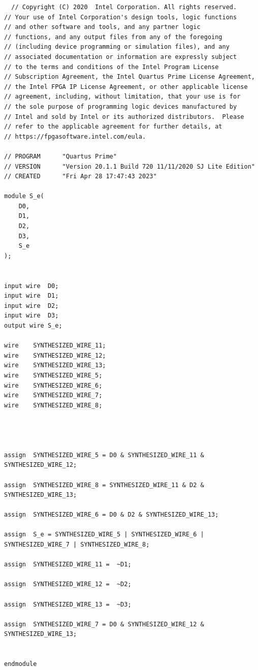 \documentclass{article}
\begin{document}
\begin{lstlisting}
  // Copyright (C) 2020  Intel Corporation. All rights reserved.
// Your use of Intel Corporation's design tools, logic functions 
// and other software and tools, and any partner logic 
// functions, and any output files from any of the foregoing 
// (including device programming or simulation files), and any 
// associated documentation or information are expressly subject 
// to the terms and conditions of the Intel Program License 
// Subscription Agreement, the Intel Quartus Prime License Agreement,
// the Intel FPGA IP License Agreement, or other applicable license
// agreement, including, without limitation, that your use is for
// the sole purpose of programming logic devices manufactured by
// Intel and sold by Intel or its authorized distributors.  Please
// refer to the applicable agreement for further details, at
// https://fpgasoftware.intel.com/eula.

// PROGRAM		"Quartus Prime"
// VERSION		"Version 20.1.1 Build 720 11/11/2020 SJ Lite Edition"
// CREATED		"Fri Apr 28 17:47:43 2023"

module S_e(
	D0,
	D1,
	D2,
	D3,
	S_e
);


input wire	D0;
input wire	D1;
input wire	D2;
input wire	D3;
output wire	S_e;

wire	SYNTHESIZED_WIRE_11;
wire	SYNTHESIZED_WIRE_12;
wire	SYNTHESIZED_WIRE_13;
wire	SYNTHESIZED_WIRE_5;
wire	SYNTHESIZED_WIRE_6;
wire	SYNTHESIZED_WIRE_7;
wire	SYNTHESIZED_WIRE_8;




assign	SYNTHESIZED_WIRE_5 = D0 & SYNTHESIZED_WIRE_11 & SYNTHESIZED_WIRE_12;

assign	SYNTHESIZED_WIRE_8 = SYNTHESIZED_WIRE_11 & D2 & SYNTHESIZED_WIRE_13;

assign	SYNTHESIZED_WIRE_6 = D0 & D2 & SYNTHESIZED_WIRE_13;

assign	S_e = SYNTHESIZED_WIRE_5 | SYNTHESIZED_WIRE_6 | SYNTHESIZED_WIRE_7 | SYNTHESIZED_WIRE_8;

assign	SYNTHESIZED_WIRE_11 =  ~D1;

assign	SYNTHESIZED_WIRE_12 =  ~D2;

assign	SYNTHESIZED_WIRE_13 =  ~D3;

assign	SYNTHESIZED_WIRE_7 = D0 & SYNTHESIZED_WIRE_12 & SYNTHESIZED_WIRE_13;


endmodule
\end{lstlisting}
\end{document}
